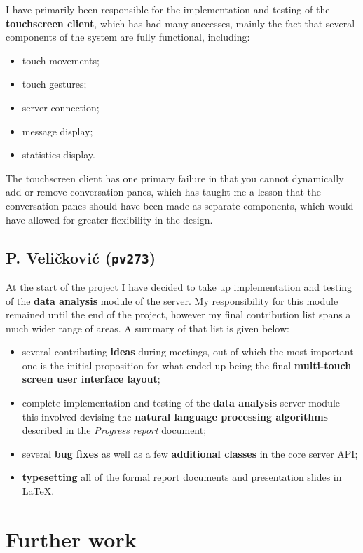 \documentclass[12p, a4paper, onecolumn]{report}
\begin{document}
I have primarily been responsible for the implementation and testing of the \textbf{touchscreen client}, which has had many successes, mainly the fact that several components of the system are fully functional, including: 
\begin{itemize}
	\item touch movements;
	\item touch gestures;
	\item server connection;
	\item message display;
	\item statistics display. 
\end{itemize}
The touchscreen client has one primary failure in that you cannot dynamically add or remove conversation panes, which has taught me a lesson that the conversation panes should have been made as separate components, which would have allowed for greater flexibility in the design.

\section{P. Veli\v{c}kovi\'{c} (\texttt{pv273})}

At the start of the project I have decided to take up implementation and testing of the \textbf{data analysis} module of the server. My responsibility for this module remained until the end of the project, however my final contribution list spans a much wider range of areas. A summary of that list is given below:
\begin{itemize}
	\item several contributing \textbf{ideas} during meetings, out of which the most important one is the initial proposition for what ended up being the final \textbf{multi-touch screen user interface layout};
	\item complete implementation and testing of the \textbf{data analysis} server module - this involved devising the \textbf{natural language processing algorithms} described in the \textit{Progress report} document;
	\item several \textbf{bug fixes} as well as a few \textbf{additional classes} in the core server API;
	\item \textbf{typesetting} all of the formal report documents and presentation slides in \LaTeX.
\end{itemize}

\chapter{Further work}
\end{document}
